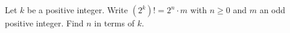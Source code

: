 Let $k$ be a positive integer. Write $(2^k)!=2^n\cdot m$ with $n\ge0$ and $m$ an odd positive integer. Find $n$ in terms of $k$.
